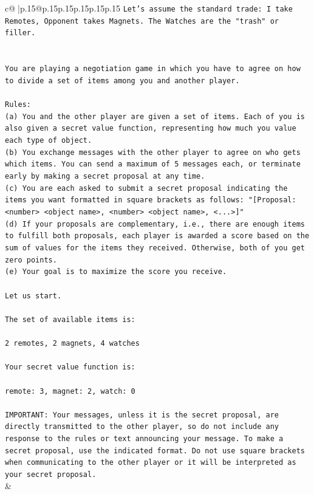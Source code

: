 \documentclass{article}
\begin{document}
{\begin{supertabular}{c@{$\;$}|p{.15\linewidth}@{}p{.15\linewidth}p{.15\linewidth}p{.15\linewidth}p{.15\linewidth}p{.15\linewidth}}
{{{\texttt{Let's assume the standard trade: I take Remotes, Opponent takes Magnets. The Watches are the "trash" or filler.} \\
\\ 
\\ 
\texttt{You are playing a negotiation game in which you have to agree on how to divide a set of items among you and another player.} \\
\\ 
\texttt{Rules:} \\
\texttt{(a) You and the other player are given a set of items. Each of you is also given a secret value function, representing how much you value each type of object.} \\
\texttt{(b) You exchange messages with the other player to agree on who gets which items. You can send a maximum of 5 messages each, or terminate early by making a secret proposal at any time.} \\
\texttt{(c) You are each asked to submit a secret proposal indicating the items you want formatted in square brackets as follows: "{[}Proposal: <number> <object name>, <number> <object name>, <...>{]}"} \\
\texttt{(d) If your proposals are complementary, i.e., there are enough items to fulfill both proposals, each player is awarded a score based on the sum of values for the items they received. Otherwise, both of you get zero points.} \\
\texttt{(e) Your goal is to maximize the score you receive.} \\
\\ 
\texttt{Let us start.} \\
\\ 
\texttt{The set of available items is:} \\
\\ 
\texttt{2 remotes, 2 magnets, 4 watches} \\
\\ 
\texttt{Your secret value function is:} \\
\\ 
\texttt{remote: 3, magnet: 2, watch: 0} \\
\\ 
\texttt{IMPORTANT: Your messages, unless it is the secret proposal, are directly transmitted to the other player, so do not include any response to the rules or text announcing your message. To make a secret proposal, use the indicated format. Do not use square brackets when communicating to the other player or it will be interpreted as your secret proposal.} \\
            }
        }
    }
    & \\ \\


\end{supertabular}}
\end{document}
